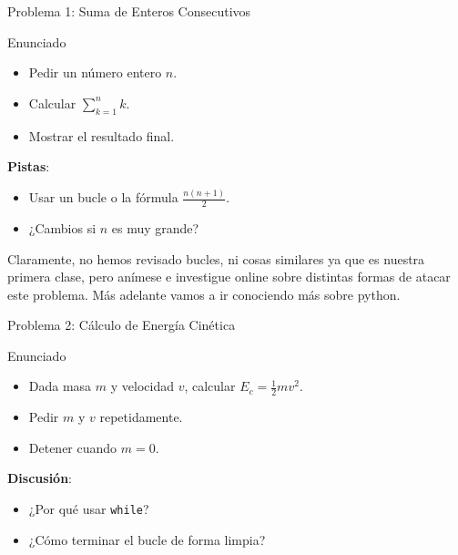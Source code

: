 \documentclass[10pt]{beamer}
\begin{document}
\begin{frame}{Problema 1: Suma de Enteros Consecutivos}
\begin{block}{Enunciado}
  \begin{itemize}
    \item Pedir un número entero \(n\).
    \item Calcular \(\sum_{k=1}^{n} k\).
    \item Mostrar el resultado final.
  \end{itemize}
\end{block}
\textbf{Pistas}:
\begin{itemize}
  \item Usar un bucle o la fórmula \(\frac{n(n+1)}{2}\).
  \item ¿Cambios si \(n\) es muy grande?
\end{itemize}

Claramente, no hemos revisado bucles, ni cosas similares ya que es nuestra primera clase, pero anímese e investigue online sobre distintas formas de atacar este problema. Más adelante vamos a ir conociendo más sobre python.

\end{frame}

\begin{frame}{Problema 2: Cálculo de Energía Cinética}
\begin{block}{Enunciado}
  \begin{itemize}
    \item Dada masa \(m\) y velocidad \(v\), calcular \(E_c = \frac{1}{2}mv^2\).
    \item Pedir \(m\) y \(v\) repetidamente.
    \item Detener cuando \(m=0\).
  \end{itemize}
\end{block}
\textbf{Discusión}:
\begin{itemize}
  \item ¿Por qué usar \texttt{while}?
  \item ¿Cómo terminar el bucle de forma limpia?
\end{itemize}
\end{frame}
\end{document}
